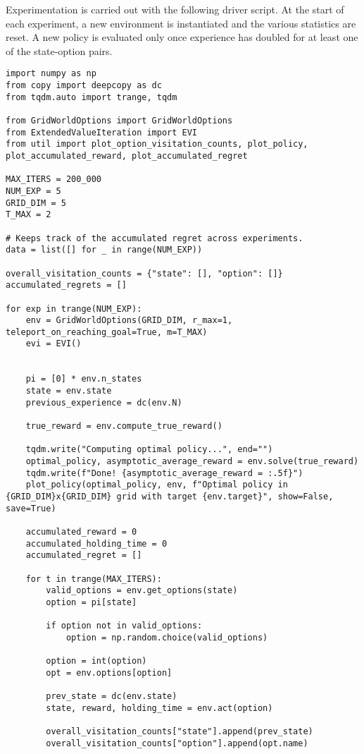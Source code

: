 Experimentation is carried out with the following driver script. 
At the start of each experiment, a new environment is instantiated and the various statistics are reset.
A new policy is evaluated only once experience has doubled for at least one of the state-option pairs.

\begin{verbatim}
import numpy as np
from copy import deepcopy as dc
from tqdm.auto import trange, tqdm

from GridWorldOptions import GridWorldOptions
from ExtendedValueIteration import EVI
from util import plot_option_visitation_counts, plot_policy, plot_accumulated_reward, plot_accumulated_regret

MAX_ITERS = 200_000
NUM_EXP = 5
GRID_DIM = 5
T_MAX = 2

# Keeps track of the accumulated regret across experiments.
data = list([] for _ in range(NUM_EXP))

overall_visitation_counts = {"state": [], "option": []}
accumulated_regrets = []

for exp in trange(NUM_EXP):
    env = GridWorldOptions(GRID_DIM, r_max=1, teleport_on_reaching_goal=True, m=T_MAX)
    evi = EVI()


    pi = [0] * env.n_states
    state = env.state
    previous_experience = dc(env.N)

    true_reward = env.compute_true_reward()

    tqdm.write("Computing optimal policy...", end="")
    optimal_policy, asymptotic_average_reward = env.solve(true_reward)
    tqdm.write(f"Done! {asymptotic_average_reward = :.5f}")
    plot_policy(optimal_policy, env, f"Optimal policy in {GRID_DIM}x{GRID_DIM} grid with target {env.target}", show=False, save=True)

    accumulated_reward = 0
    accumulated_holding_time = 0
    accumulated_regret = []

    for t in trange(MAX_ITERS):
        valid_options = env.get_options(state)
        option = pi[state]

        if option not in valid_options:
            option = np.random.choice(valid_options)

        option = int(option)
        opt = env.options[option]

        prev_state = dc(env.state)
        state, reward, holding_time = env.act(option)

        overall_visitation_counts["state"].append(prev_state)
        overall_visitation_counts["option"].append(opt.name)


\end{verbatim}
